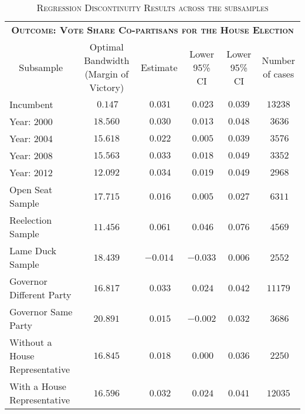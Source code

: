 \begin{table}[!tbp]
\caption{\textsc{Regression Discontinuity Results across the subsamples }\label{}} 
\begin{tabular}{lccccc}
\toprule
\multicolumn{6}{c}{\bfseries \bfseries{\textsc{Outcome: Vote Share Co-partisans for the House Election}}}\tabularnewline
\cline{1-6}
\multicolumn{1}{c}{Subsample}&\multicolumn{1}{c}{Optimal Bandwidth (Margin of Victory)}&\multicolumn{1}{c}{Estimate}&\multicolumn{1}{c}{Lower 95\% CI}&\multicolumn{1}{c}{Lower 95\% CI}&\multicolumn{1}{c}{Number of cases}\tabularnewline
\midrule
Incumbent&$~0.147$&$~0.031$&$~0.023$&$0.039$&$13238$\tabularnewline
Year: 2000&$18.560$&$~0.030$&$~0.013$&$0.048$&$~3636$\tabularnewline
Year: 2004&$15.618$&$~0.022$&$~0.005$&$0.039$&$~3576$\tabularnewline
Year: 2008&$15.563$&$~0.033$&$~0.018$&$0.049$&$~3352$\tabularnewline
Year: 2012&$12.092$&$~0.034$&$~0.019$&$0.049$&$~2968$\tabularnewline
Open Seat Sample&$17.715$&$~0.016$&$~0.005$&$0.027$&$~6311$\tabularnewline
Reelection Sample&$11.456$&$~0.061$&$~0.046$&$0.076$&$~4569$\tabularnewline
Lame Duck Sample&$18.439$&$-0.014$&$-0.033$&$0.006$&$~2552$\tabularnewline
Governor Different Party&$16.817$&$~0.033$&$~0.024$&$0.042$&$11179$\tabularnewline
Governor Same Party&$20.891$&$~0.015$&$-0.002$&$0.032$&$~3686$\tabularnewline
Without a House Representative&$16.845$&$~0.018$&$~0.000$&$0.036$&$~2250$\tabularnewline
With a House Representative&$16.596$&$~0.032$&$~0.024$&$0.041$&$12035$\tabularnewline
\bottomrule
\end{tabular}
\end{table}
